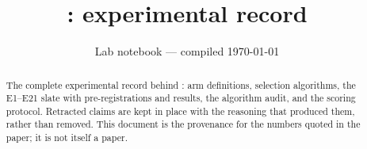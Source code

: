 \documentclass[11pt]{article}
\title{\cleo{}: experimental record}
\author{}
\date{Lab notebook --- compiled \today}
\begin{document}
\maketitle
\thispagestyle{empty}

\begin{abstract}
\noindent
The complete experimental record behind \cleo{}: arm definitions, selection
algorithms, the E1--E21 slate with pre-registrations and results, the algorithm
audit, and the scoring protocol. Retracted claims are kept in place with the
reasoning that produced them, rather than removed. This document is the
provenance for the numbers quoted in the paper; it is not itself a paper.
\end{abstract}

\clearpage
\setcounter{tocdepth}{2}
\tableofcontents
\clearpage



\clearpage
{}


\end{document}
